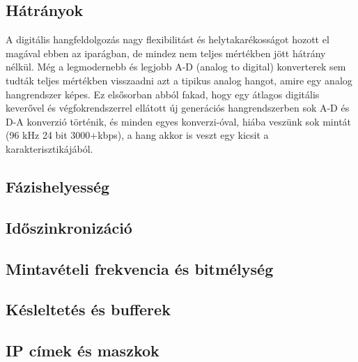 \subsection{Hátrányok}
A digitális hangfeldolgozás nagy flexibilitást és helytakarékosságot hozott el
magával ebben az iparágban, de mindez nem teljes mértékben jött hátrány nélkül.
Még a legmodernebb és legjobb A-D (analog to digital) konverterek sem tudták
teljes mértékben visszaadni azt a tipikus analog hangot, amire egy analog
hangrendszer képes. Ez elsősorban abból fakad, hogy egy átlagos digitális
keverővel és végfokrendszerrel ellátott új generációs hangrendszerben sok A-D és
D-A konverzió történik, és minden egyes konverzi-óval, hiába veszünk sok mintát
(96 kHz 24 bit 3000+kbps), a hang akkor is veszt egy kicsit a
karakterisztikájából.
\subsection{Fázishelyesség}

\subsection{Időszinkronizáció}

\subsection{Mintavételi frekvencia és bitmélység}

\subsection{Késleltetés és bufferek}

\subsection{IP címek és maszkok}

